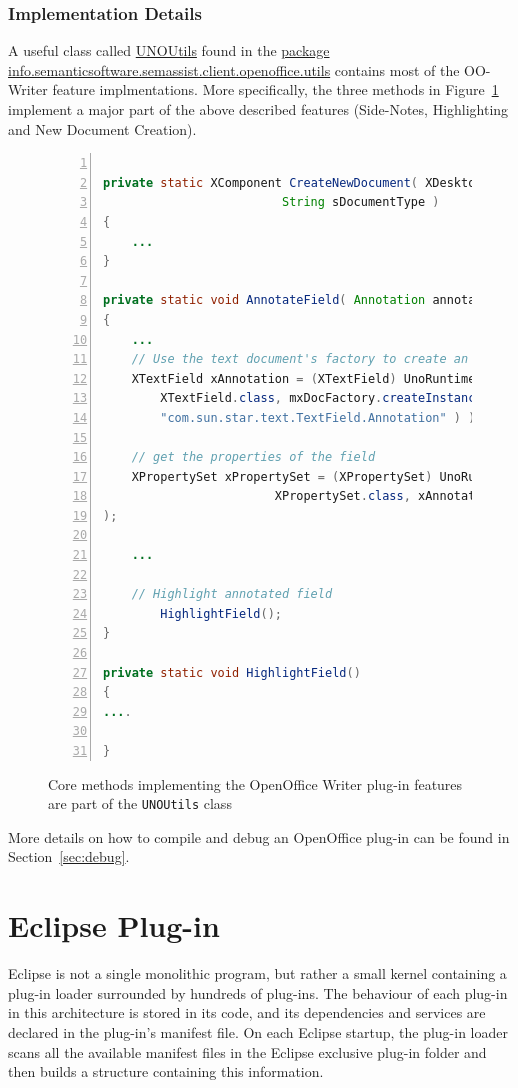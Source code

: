 \subsubsection{Implementation Details}
A useful class called \url{UNOUtils} found in the \url{package
  info.semanticsoftware.semassist.client.openoffice.utils} contains most of
the OO-Writer feature implmentations.  More specifically, the three methods in
Figure~\ref{list:ssb} implement a major part of the above described features
(Side-Notes, Highlighting and New Document Creation).

\begin{figure}
\centering
\begin{lstlisting}[language=Java,numbers=left,xleftmargin=8mm,columns=flexible]

private static XComponent CreateNewDocument( XDesktop xDesktop, 
					     String sDocumentType )
{
	...
}

private static void AnnotateField( Annotation annotation )
{
	...
	// Use the text document's factory to create an Annotation text field
	XTextField xAnnotation = (XTextField) UnoRuntime.queryInterface(
		XTextField.class, mxDocFactory.createInstance(
		"com.sun.star.text.TextField.Annotation" ) );
	
	// get the properties of the field
	XPropertySet xPropertySet = (XPropertySet) UnoRuntime.queryInterface( 
						XPropertySet.class, xAnnotation
);
	
	...
	
	// Highlight annotated field
        HighlightField();
}

private static void HighlightField()
{
....

}
\end{lstlisting}
\caption{Core methods implementing the OpenOffice Writer plug-in features are
  part of the \texttt{UNOUtils} class}
\label{list:ssb}
\end{figure}


More details on how to compile and debug an OpenOffice plug-in can be found in
Section~\ref{sec:debug}.
 
\section{Eclipse Plug-in}
Eclipse is not a single monolithic program, but rather a small kernel containing
a plug-in loader surrounded by hundreds of plug-ins. The behaviour of each
plug-in in this architecture is stored in its code, and its dependencies and
services are declared in the plug-in's manifest file. On each Eclipse startup,
the plug-in loader scans all the available manifest files in the Eclipse
exclusive plug-in folder and then builds a structure containing this
information.

